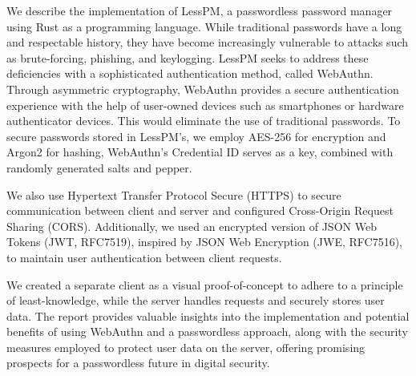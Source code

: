 We describe the implementation of LessPM, a passwordless password manager
using Rust as a programming language.
While traditional passwords have a long and respectable history, they have
become increasingly vulnerable to attacks such as brute-forcing, phishing, and
keylogging.
LessPM seeks to address these deficiencies with a sophisticated
authentication method, called WebAuthn.
Through asymmetric cryptography, WebAuthn provides a secure authentication
experience with the help of user-owned devices such as smartphones or hardware
authenticator devices.
This would eliminate the use of traditional passwords.
To secure passwords stored in LessPM's, we employ AES-256 for encryption and
Argon2 for hashing, WebAuthn's Credential ID serves as a key, combined with
randomly generated salts and pepper.

We also use Hypertext Transfer Protocol Secure (HTTPS) to secure
communication between client and server and configured Cross-Origin Request
Sharing (CORS).
Additionally, we used an encrypted version of JSON Web Tokens (JWT, RFC7519),
inspired by JSON Web Encryption (JWE, RFC7516), to maintain user authentication
between client requests.

We created a separate client as a visual proof-of-concept to adhere to a
principle of least-knowledge, while the server handles requests and securely
stores user data.
The report provides valuable insights into the implementation and potential
benefits of using WebAuthn and a passwordless approach, along with the security
measures employed to protect user data on the server, offering promising
prospects for a passwordless future in digital security.